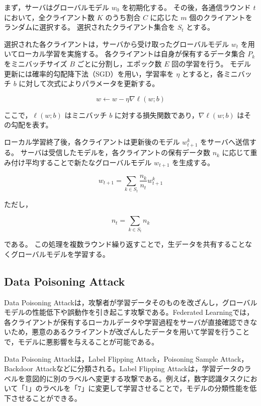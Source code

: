 \documentclass[a4j, twocolumn, dvipdfmx]{jsarticle}  %
\begin{document}
まず，サーバはグローバルモデル $w_0$ を初期化する。
その後，各通信ラウンド $t$ において，全クライアント数 $K$ のうち割合 $C$ に応じた $m$ 個のクライアントをランダムに選択する。
選択されたクライアント集合を $S_t$ とする。

選択された各クライアントは，サーバから受け取ったグローバルモデル $w_t$ を用いてローカル学習を実施する。
各クライアントは自身が保有するデータ集合 $P_k$ をミニバッチサイズ $B$ ごとに分割し，エポック数 $E$ 回の学習を行う。
モデル更新には確率的勾配降下法（SGD）を用い，学習率を $\eta$ とすると，各ミニバッチ $b$ に対して次式によりパラメータを更新する。

\begin{equation}
w \leftarrow w-\eta\nabla \ell(w;b)
\end{equation}

ここで，$\ell(w;b)$ はミニバッチ $b$ に対する損失関数であり，$\nabla \ell(w;b)$ はその勾配を表す。

ローカル学習終了後，各クライアントは更新後のモデル $w_{t+1}^{k}$ をサーバへ送信する。
サーバは受信したモデルを，各クライアントの保有データ数 $n_k$ に応じて重み付け平均することで新たなグローバルモデル $w_{t+1}$ を生成する。

\begin{equation}
w_{t+1}
=
\sum_{k \in S_t}
\frac{n_k}{n_t}
w_{t+1}^{k}
\end{equation}

ただし，

\begin{equation}
n_t=\sum_{k\in S_t}n_k
\end{equation}

である。
この処理を複数ラウンド繰り返すことで，生データを共有することなくグローバルモデルを学習する。
\subsection{Data Poisoning Attack}

Data Poisoning Attackは，攻撃者が学習データそのものを改ざんし，グローバルモデルの性能低下や誤動作を引き起こす攻撃である。Federated Learningでは，各クライアントが保有するローカルデータや学習過程をサーバが直接確認できないため，悪意のあるクライアントが改ざんしたデータを用いて学習を行うことで，モデルに悪影響を与えることが可能である\cite{sagar2023survey}。

Data Poisoning Attackは，Label Flipping Attack，Poisoning Sample Attack，Backdoor Attackなどに分類される。Label Flipping Attackは，学習データのラベルを意図的に別のラベルへ変更する攻撃である。例えば，数字認識タスクにおいて「1」のラベルを「7」に変更して学習させることで，モデルの分類性能を低下させることができる。
\end{document}
